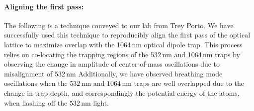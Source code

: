 \paragraph{Aligning the first pass:}
The following is a technique conveyed to our lab from Trey Porto.
We have successfully used this technique to reproducibly align the first pass of the optical lattice to maximize overlap with the 1064\,nm optical dipole trap.
This process relies on co-locating the trapping regions of the 532\,nm and 1064\,nm traps by observing the change in amplitude of center-of-mass oscillations due to misalignment of 532\,nm 
Additionally, we have observed breathing mode oscillations when the $532$\,nm and $1064$\,nm traps are well overlapped due to the change in trap depth, and correspondingly the potential energy of the atoms, when flashing off the $532$\,nm light.

